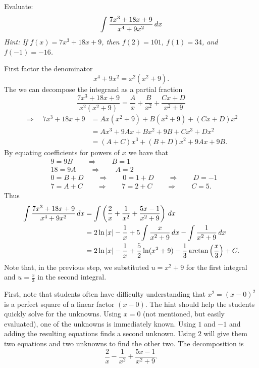 \documentclass[noinstructornotes]{ximera}
\begin{document}
\begin{problem}
Evaluate:
	\[
	\int \frac{7x^3 + 18x + 9}{x^4 + 9x^2} \,d x
	\]
{\it Hint:  If $f(x) = 7x^3 + 18x + 9$, then $f(2) = 101$, $f(1) = 34$, and $f(-1) = -16$.}
	\begin{freeResponse}
	First factor the denominator
		\[
		x^4 + 9x^2 = x^2(x^2 + 9).
		\]
	The we can decompose the integrand as a partial fraction
		\begin{equation*}
		\frac{7x^3+18x+9}{x^2(x^2+9)} = \frac{A}{x} + \frac{B}{x^2} + \frac{Cx+D}{x^2+9}
		\end{equation*}
		\begin{align*}
		\Longrightarrow	\quad	7x^3 + 18x + 9 &= Ax(x^2+9) + B(x^2+9) + (Cx+D)x^2  \\
		&= Ax^3 + 9Ax + Bx^2 + 9B + Cx^3 + Dx^2  \\
		&= (A+C)x^3 + (B+D)x^2 + 9Ax + 9B.
		\end{align*}
	By equating coefficients for powers of $x$ we have that
		\begin{align*}
		&9 = 9B 	\qquad	\Longrightarrow	\qquad	B = 1  \\
		&18=9A 	\qquad	\Longrightarrow	\qquad	A = 2  \\
		&0 = B+D 	\qquad	\Longrightarrow	\qquad	0 = 1 + D 	\qquad \Longrightarrow \qquad D = -1  \\
		&7=A+C 	\qquad	\Longrightarrow	\qquad	7=2+C 	\qquad \Longrightarrow \qquad C = 5.
		\end{align*}
	Thus
		\begin{align*}
		\int \frac{7x^3 + 18x + 9}{x^4 + 9x^2} \,d x
		&= \int \left( \frac{2}{x} + \frac{1}{x^2} + \frac{5x-1}{x^2+9} \right) \,d x  \\
		&= 2 \ln |x| - \frac{1}{x} + 5 \int \frac{x}{x^2 + 9} \,d x - \int \frac{1}{x^2 + 9} \,d x  \\
		&= 2 \ln |x| - \frac{1}{x} + \frac{5}{2} \ln (x^2 + 9) - \frac{1}{3} \arctan \left( \frac{x}{3} \right) + C.
		\end{align*}
	Note that, in the previous step, we substituted $u = x^2 + 9$ for the first integral and $u = \frac{x}{3}$ in the second integral.
	\end{freeResponse}
		
\end{problem}

\begin{instructorNotes}
First, note that students often have difficulty understanding that $x^2 = (x-0)^2$ is a perfect square of a linear factor $(x-0)$.  
The hint should help the students quickly solve for the unknowns.  
Using $x=0$ (not mentioned, but easily evaluated), one of the unknowns is immediately known.  
Using $1$ and $-1$ and adding the resulting equations finds a second unknown.  
Using $2$ will give them two equations and two unknowns to find the other two.  
The decomposition is
	\[
	\frac{2}{x} - \frac{1}{x^2} + \frac{5x-1}{x^2 + 9}.
	\]
\end{instructorNotes}
\end{document}
